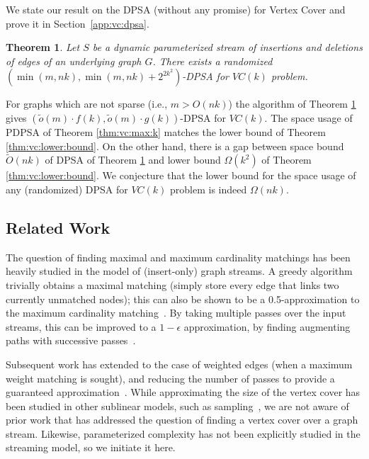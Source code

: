 \documentclass[11pt,letter]{article}
\newtheorem{theorem}{Theorem}
\begin{document}
We state our result on the DPSA (without any promise) for Vertex Cover
and prove it in Section~\ref{app:vc:dpsa}.

\begin{theorem}
\label{THM:VC:DPSA}
Let $S$ be a dynamic parameterized stream of  insertions and deletions of edges of an underlying graph $G$.
There exists a randomized $(\min(m,nk), \min(m,nk)+2^{2k^2})$-DPSA for $VC(k)$ problem.
\end{theorem}

For graphs which are not  sparse (i.e., $m>O(nk)$) the algorithm of Theorem \ref{THM:VC:DPSA}
gives $(\tilde{o}(m)\cdot f(k),\tilde{o}(m)\cdot g(k))$-DPSA for $VC(k)$.
The space usage of PDPSA of Theorem \ref{thm:vc:max:k} matches
the lower bound of Theorem \ref{thm:vc:lower:bound}. On the other hand,
there is a gap between space bound $\tilde{O}(nk)$ of DPSA of Theorem \ref{THM:VC:DPSA}
and lower bound $\Omega(k^2)$ of Theorem \ref{thm:vc:lower:bound}.
We conjecture that the lower bound for the space usage of any
(randomized) DPSA for $VC(k)$ problem is indeed $\Omega(nk)$.




\subsection{Related Work}

The question of finding maximal and maximum cardinality matchings has
been heavily studied in the model of (insert-only) graph streams.
A greedy algorithm trivially obtains a maximal matching (simply store
every edge that links two currently unmatched nodes); this can also be
shown to be a 0.5-approximation to the maximum cardinality matching~\cite{Feigenbaum:Kannan:McGregor:Suri:Zhang:05}.
By taking multiple passes over the input streams, this can be improved
to a $1-\epsilon$ approximation, by finding augmenting paths with
successive passes~\cite{McGregor:05,McGregor:09}.

Subsequent work has extended to the case of weighted edges (when a
maximum weight matching is sought), and reducing the number of passes
to provide a guaranteed approximation~\cite{Eggert:Kliemann:Srivastav:09,Eggert:Kliemann:Munstermann:Srivastav:12}.
While approximating the size of the vertex cover has been studied in other sublinear models, such as
sampling~\cite{Parnas:Ron:07,Onak:Ron:Rosen:Rubinfeld:12}, we are not
aware of prior work that has addressed the question of finding a
vertex cover over a graph stream.
Likewise, parameterized complexity has not been explicitly studied in
the streaming model, so we initiate it here.
\end{document}
